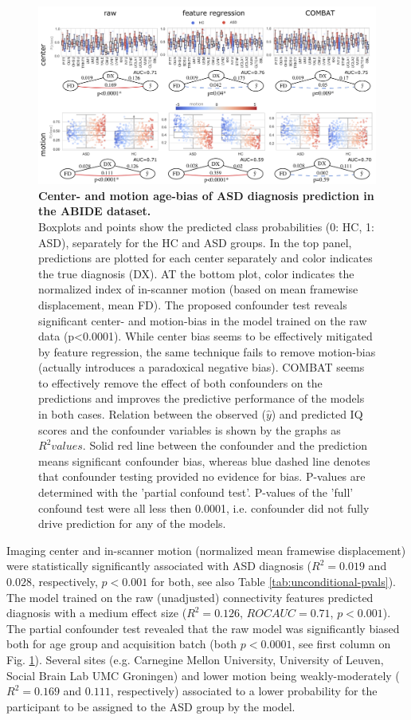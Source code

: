 \documentclass{article}
\begin{document}
\begin{figure}[!b]
  \centering
  \includegraphics[width=0.75\paperwidth]{fig/fig_abide.png}
  \caption{\textbf{Center- and motion age-bias of ASD diagnosis prediction in the ABIDE dataset.} \\
  Boxplots and points show the predicted class probabilities (0: HC, 1: ASD), separately for the HC and ASD groups. In the top panel, predictions are plotted for each center separately and color indicates the true diagnosis (DX). AT the bottom plot, color indicates the normalized index of in-scanner motion (based on mean framewise displacement, mean FD). The proposed confounder test reveals significant center- and motion-bias in the model trained on the raw data (p<0.0001). While center bias seems to be effectively mitigated by feature regression, the same technique fails to remove motion-bias (actually introduces a paradoxical negative bias). COMBAT seems to effectively remove the effect of both confounders on the predictions and improves the predictive performance of the models in both cases.
  Relation between the observed ($\hat{y}$) and predicted IQ scores and the confounder variables is shown by the graphs as $R^2 values$. Solid red line between the confounder and the prediction means significant confounder bias, whereas blue dashed line denotes that confounder testing provided no evidence for bias. P-values are determined with the 'partial confound test'. P-values of the 'full' confound test were all less then 0.0001, i.e. confounder did not fully drive prediction for any of the models.
  }
  \label{fig:abide}
\end{figure}

Imaging center and in-scanner motion (normalized mean framewise displacement) were statistically significantly associated with ASD diagnosis ($R^2=0.019$ and $0.028$, respectively, $p<0.001$ for both, see also Table \ref{tab:unconditional-pvals}). The model trained on the raw (unadjusted) connectivity features predicted diagnosis with a medium effect size ($R^2=0.126$, $ROC AUC = 0.71$, $p<0.001$).
The partial confounder test revealed that the raw model was significantly biased both for age group and acquisition batch (both $p<0.0001$, see first column on Fig. \ref{fig:abide}). Several sites (e.g. Carnegine Mellon University, University of Leuven, Social Brain Lab UMC Groningen) and lower motion being weakly-moderately ($R^2=0.169$ and $0.111$, respectively) associated to a lower probability for the participant to be assigned to the ASD group by the model.
\end{document}

